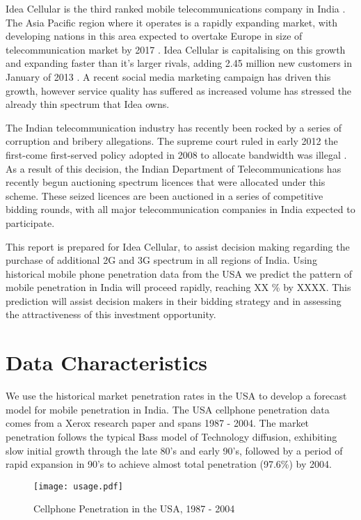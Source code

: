 \documentclass[11pt]{article}
\begin{document}
	Idea Cellular is the third ranked mobile telecommunications company in India \cite{TELECOMREGULATORYAUTHORITYOFINDIA2012}.
	The Asia Pacific region where it operates is a rapidly expanding market, with developing nations in this area expected to overtake Europe in size of telecommunication market by 2017 \cite{AnalysysMasos}.
	Idea Cellular is capitalising on this growth and expanding faster than it's larger rivals, adding 2.45 million new customers in January of 2013 \cite{KRISHNAa}.
	A recent social media marketing campaign has driven this growth\cite{MNP}, however service quality has suffered as increased volume has stressed the already thin spectrum that Idea owns. 


	The Indian telecommunication industry has recently been rocked by a series of corruption and bribery allegations.
	The supreme court ruled in early 2012 the first-come first-served policy adopted in 2008 to allocate bandwidth was illegal \cite{KRISHNA}.
	As a result of this decision, the Indian Department of Telecommunications has recently begun auctioning spectrum licences that were allocated under this scheme.
	These seized licences are been auctioned in a series of competitive bidding rounds, with all major telecommunication companies in India expected to participate.


	This report is prepared for Idea Cellular, to assist decision making regarding the purchase of additional 2G and 3G spectrum in all regions of India.
	Using historical mobile phone penetration data from the USA we predict the pattern of mobile penetration in India will proceed rapidly, reaching XX \% by XXXX.
	This prediction will assist decision makers in their bidding strategy and in assessing the attractiveness of this investment opportunity.



\newpage
	\section{Data Characteristics}
		We use the historical market penetration rates in the USA to develop a forecast model for mobile penetration in India.
		The USA cellphone penetration data comes from a Xerox research paper and spans 1987 - 2004.\cite{Lilien1999}
		The market penetration follows the typical Bass model of Technology diffusion, exhibiting slow initial growth through the late 80's and early 90's, followed by a period of rapid expansion in 90's to achieve almost total penetration (97.6\%) by 2004.
		\begin{figure}[h!]
			\centering
			\texttt{[image: usage.pdf]}
			\caption{Cellphone Penetration in the USA, 1987 - 2004}		%
			\label{fig:pen}
		\end{figure}
\end{document}
